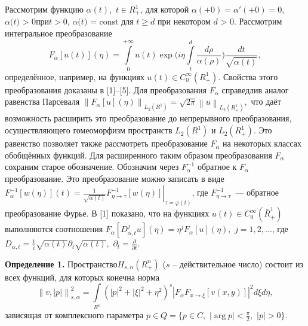 




Рассмотрим функцию $\alpha (t),\,\,t \in R_ + ^1 $, для которой $\alpha ( +
0) = {\alpha }'( + 0) = 0$, $\alpha \mbox{(}t\mbox{) > 0}$при$t > 0$,
$\alpha \mbox{(}t\mbox{) = const}$ для $t \geqslant d$ при некотором $d\mbox{ >
0}$. Рассмотрим интегральное преобразование
\[
F_\alpha [u(t)](\eta ) = \int\limits_0^{ + \infty } {u(t)\exp (i\eta }
\int\limits_t^d {\frac{d\rho }{\alpha (\rho )}} )\frac{dt}{\sqrt {\alpha
(t)} },
\]
определённое, например,
на функциях $u(t) \in C_0^\infty (R_ + ^1
)$.
Свойства этого преобразования доказаны в
[1]--[5].
Для преобразования $F_\alpha $ справедлив аналог равенства Парсеваля
$\left\| {F_\alpha [u](\eta )} \right\|_{L_2 (R^1)} = \sqrt {2\pi } \left\|
u \right\|_{L_2 (R_ + ^1 )} ,$ что даёт возможность расширить это
преобразование до непрерывного преобразования, осуществляющего гомеоморфизм
пространств $L_{2} (R^1)$ и $L_{2} (R_ + ^1 )$. Это равенство
позволяет также рассмотреть преобразование $F_\alpha $ на некоторых классах
обобщённых функций. Для расширенного таким образом
\linebreak
преобразования $F_\alpha
$ сохраним старое обозначение. Обозначим через $F_\alpha ^{ - 1} $ обратное
к $F_\alpha $ преобразование. Это преобразование можно записать в виде
$F_\alpha ^{ - 1} [w(\eta )](t) = \left. {\frac{1}{\sqrt {\alpha (t)}
}F_{\eta \to \tau }^{ - 1} [w(\eta )]} \right|_{\tau = \varphi (t)} $, где
$F_{\eta \to \tau }^{ - 1} $~--- обратное преобразование Фурье. В [1]
показано, что на функциях $u(t) \in C_0^\infty (\bar {R}_ + ^1 )$
выполняются соотношения
\linebreak
$F_\alpha [D_{\alpha ,t}^j u](\eta ) = \eta
^jF_\alpha [u](\eta ),\,\,j = 1,2,...$, где $D_{\alpha ,t} =
\frac{1}{i}\sqrt {\alpha (t)} \partial _t \sqrt {\alpha (t)}
,$ $\partial _t = \frac{\partial }{\partial t}.$

\textbf{Определение 1.} Пространство$H_{s,\alpha } (R_ + ^n )$ ($s$ --
действительное число) состоит из всех функций, для которых конечна норма
\[
\left\| {v,\left| p \right|} \right\|_{s,\alpha }^2 = \int\limits_{R^n}
{(\left| p \right|^2 + \left| \xi \right|^2 + \eta ^2)^s\left| {F_\alpha
F_{x \to \xi } [v(x,y)]} \right|^2d\xi d\eta } ,
\]
зависящая от комплексного параметра $p \in Q = \{p \in C,\,\,\left| {\arg p}
\right| < \frac{\pi }{2},\,\,\left| p \right| > 0\}$.

